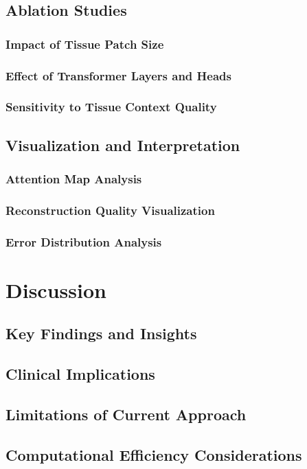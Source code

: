 \documentclass[12pt,a4paper]{report}
\begin{document}
\section{Ablation Studies}
\subsection{Impact of Tissue Patch Size}
\subsection{Effect of Transformer Layers and Heads}
\subsection{Sensitivity to Tissue Context Quality}
\section{Visualization and Interpretation}
\subsection{Attention Map Analysis}
\subsection{Reconstruction Quality Visualization}
\subsection{Error Distribution Analysis}

\chapter{Discussion}
\section{Key Findings and Insights}
\section{Clinical Implications}
\section{Limitations of Current Approach}
\section{Computational Efficiency Considerations}
\end{document}
